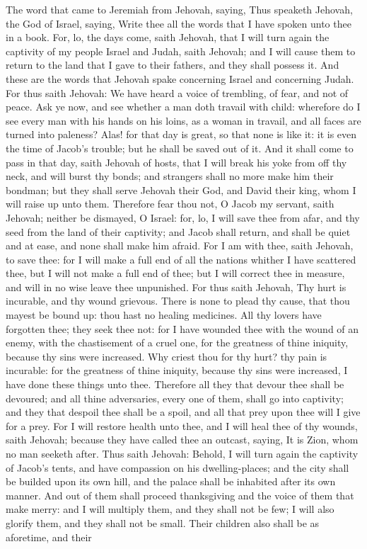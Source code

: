 The word that came to Jeremiah from Jehovah, saying, Thus speaketh Jehovah, the God of Israel, saying, Write thee all the words that I have spoken unto thee in a book. For, lo, the days come, saith Jehovah, that I will turn again the captivity of my people Israel and Judah, saith Jehovah; and I will cause them to return to the land that I gave to their fathers, and they shall possess it.  And these are the words that Jehovah spake concerning Israel and concerning Judah. For thus saith Jehovah: We have heard a voice of trembling, of fear, and not of peace. Ask ye now, and see whether a man doth travail with child: wherefore do I see every man with his hands on his loins, as a woman in travail, and all faces are turned into paleness? Alas! for that day is great, so that none is like it: it is even the time of Jacob’s trouble; but he shall be saved out of it. And it shall come to pass in that day, saith Jehovah of hosts, that I will break his yoke from off thy neck, and will burst thy bonds; and strangers shall no more make him their bondman; but they shall serve Jehovah their God, and David their king, whom I will raise up unto them. Therefore fear thou not, O Jacob my servant, saith Jehovah; neither be dismayed, O Israel: for, lo, I will save thee from afar, and thy seed from the land of their captivity; and Jacob shall return, and shall be quiet and at ease, and none shall make him afraid. For I am with thee, saith Jehovah, to save thee: for I will make a full end of all the nations whither I have scattered thee, but I will not make a full end of thee; but I will correct thee in measure, and will in no wise leave thee unpunished.  For thus saith Jehovah, Thy hurt is incurable, and thy wound grievous. There is none to plead thy cause, that thou mayest be bound up: thou hast no healing medicines. All thy lovers have forgotten thee; they seek thee not: for I have wounded thee with the wound of an enemy, with the chastisement of a cruel one, for the greatness of thine iniquity, because thy sins were increased. Why criest thou for thy hurt? thy pain is incurable: for the greatness of thine iniquity, because thy sins were increased, I have done these things unto thee. Therefore all they that devour thee shall be devoured; and all thine adversaries, every one of them, shall go into captivity; and they that despoil thee shall be a spoil, and all that prey upon thee will I give for a prey. For I will restore health unto thee, and I will heal thee of thy wounds, saith Jehovah; because they have called thee an outcast, saying, It is Zion, whom no man seeketh after.  Thus saith Jehovah: Behold, I will turn again the captivity of Jacob’s tents, and have compassion on his dwelling-places; and the city shall be builded upon its own hill, and the palace shall be inhabited after its own manner. And out of them shall proceed thanksgiving and the voice of them that make merry: and I will multiply them, and they shall not be few; I will also glorify them, and they shall not be small. Their children also shall be as aforetime, and their 